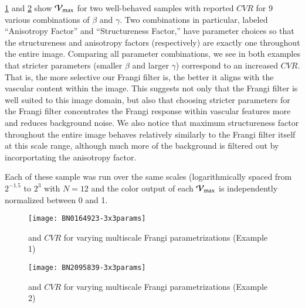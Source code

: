 \cref{fig:compare_parameters_3by3_example1} and \cref{fig:compare_parameters_3by3_example2} show $\mathcal{V}_{\max}$ for two well-behaved samples with reported $CVR$ for 9 various combinations of $\beta$ and $\gamma$. Two combinations in particular, labeled ``Anisotropy Factor'' and ``Structureness Factor,'' have parameter choices so that the structureness and anisotropy factors (respectively) are exactly one throughout the entire image. Comparing all parameter combinations, we see in both examples that stricter parameters (smaller $\beta$ and larger $\gamma$) correspond to an increased $CVR$. That is, the more selective our Frangi filter is, the better it aligns with the vascular content within the image. This suggests not only that the Frangi filter is well suited to this image domain, but also that choosing stricter parameters for the Frangi filter concentrates the Frangi response within vascular features more and reduces background noise. We also notice that maximum structureness factor throughout the entire image behaves relatively similarly to the Frangi filter itself at this scale range, although much more of the background is filtered out by incorportating the anisotropy factor.

Each of these sample was run over the same scales (logarithmically spaced from $2^{-1.5}$ to $2^{3}$ with $N=12$ and the color output of each $\mathcal{V}_{\max}$ is independently normalized between 0 and 1.




\begin{figure}[p]\centering
		\texttt{[image: BN0164923-3x3params]}
	\caption{\Vmax  and $CVR$ for varying multiscale Frangi parametrizations (Example 1)}
	\label{fig:compare_parameters_3by3_example1}
\end{figure}

\begin{figure}[p]\centering
	\texttt{[image: BN2095839-3x3params]}
	\caption{\Vmax  and $CVR$ for varying multiscale Frangi parametrizations (Example 2)}
	\label{fig:compare_parameters_3by3_example2}
\end{figure}

